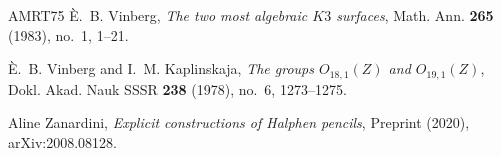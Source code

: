 \documentclass{amsart}
\newif\ifshort
\begin{document}
\begin{thebibliography}{AMRT75}
\`E.~B. Vinberg, \emph{The two most algebraic {$K3$} surfaces}, Math. Ann.
  \textbf{265} (1983), no.~1, 1--21. 

\`E.~B. Vinberg and I.~M. Kaplinskaja, \emph{The groups {$O_{18,1}(Z)$} and
  {$O_{19,1}(Z)$}}, Dokl. Akad. Nauk SSSR \textbf{238} (1978), no.~6,
  1273--1275. 

Aline Zanardini, \emph{Explicit constructions of {H}alphen pencils}, Preprint
  (2020), arXiv:2008.08128.

\end{thebibliography}

 

\ifshort 
\else
\listoffigures 
\listoftables 
\fi
\end{document}
